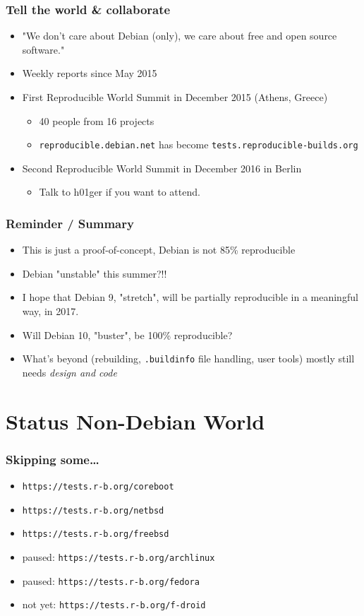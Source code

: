 \documentclass[14pt,aspectratio=169]{beamer}
\newif\ifplacelogo
\begin{document}
\begin{frame}
 \frametitle{Tell the world \& collaborate}

 \begin{itemize}
  \item "We don't care about Debian (only), we care about free and open
   source software."
  \item<2-4> Weekly reports since May 2015
  \item<3-4> First Reproducible World Summit in December 2015 (Athens, Greece)
   \begin{itemize}
    \item<3-4> 40 people from 16 projects
    \item<3-4> \texttt{reproducible.debian.net} has become \texttt{tests.reproducible-builds.org}
   \end{itemize}
    \item<4> Second Reproducible World Summit in December 2016 in Berlin
   \begin{itemize}
    \item<4> Talk to h01ger if you want to attend.
   \end{itemize}
 \end{itemize}
\end{frame}

\begin{frame}
 \frametitle{Reminder / Summary}
 \begin{itemize}
  \item This is just a proof-of-concept, Debian is not 85\% reproducible
  \item Debian "unstable" this summer?!!
  \item<2-3> I hope that Debian 9, "stretch", will be partially reproducible
  in a meaningful way, in 2017.
  \item<2-3> Will Debian 10, "buster", be 100\% reproducible?
  \item<3> What's beyond (rebuilding, \texttt{.buildinfo} file handling, user
  tools) mostly still needs \it{design} and code
 \end{itemize}
\end{frame}


\section{Status Non-Debian World}

\placelogofalse

\begin{frame}
 \frametitle{Skipping some…}
 \begin{itemize}
  \item \texttt{https://tests.r-b.org/coreboot}
  \item \texttt{https://tests.r-b.org/netbsd}
  \item \texttt{https://tests.r-b.org/freebsd}
  \item paused: \texttt{https://tests.r-b.org/archlinux}
  \item paused: \texttt{https://tests.r-b.org/fedora}
  \item not yet: \texttt{https://tests.r-b.org/f-droid}
 \end{itemize}
\end{frame}
\end{document}
